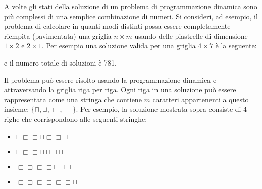 A volte gli stati della soluzione di un problema di 
programmazione dinamica sono più complessi di 
una semplice combinazione di numeri.
Si consideri, ad esempio, il problema
di calcolare in quanti modi distinti 
possa essere completamente riempita
(pavimentata) una griglia $n \times m$ 
usando delle piastrelle di dimensione $1 \times 2$ e $2 \times 1$.
Per esempio una soluzione valida per una griglia $4 \times 7$ è
la seguente:
\begin{center}
\end{center}
e il numero totale di soluzioni è 781.

Il problema può essere risolto usando la programmazione dinamica e
attraversando la griglia riga per riga.
Ogni riga in una soluzione può essere rappresentata
come una stringa che contiene $m$ caratteri appartenenti a questo insieme: 
$\{\sqcap, \sqcup, \sqsubset, \sqsupset \}$.
Per esempio, la soluzione mostrata sopra consiste di 4 righe 
che corrispondono alle seguenti stringhe:
\begin{itemize}
\item
$\sqcap \sqsubset \sqsupset \sqcap \sqsubset \sqsupset \sqcap$
\item
$\sqcup \sqsubset \sqsupset \sqcup \sqcap \sqcap \sqcup$
\item
$\sqsubset \sqsupset \sqsubset \sqsupset \sqcup \sqcup \sqcap$ 
\item
$\sqsubset \sqsupset \sqsubset \sqsupset \sqsubset \sqsupset \sqcup$
\end{itemize}

